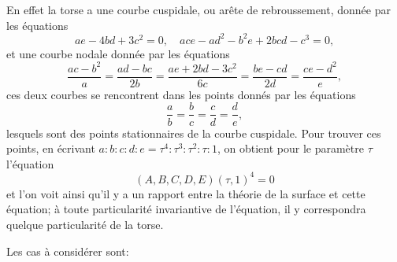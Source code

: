 \documentclass[11pt,a4paper]{article}
\begin{document}
En effet la torse a une courbe cuspidale, ou ar\^ete de rebroussement, donn\'ee par
les \'equations
\[
ae - 4bd + 3c^2 = 0,\quad ace - ad^2 - b^2 e + 2bcd - c^3 = 0,
\]
et une courbe nodale donn\'ee par les \'equations
\[
\frac{ac - b^2}{a} = \frac{ad - bc}{2b} = \frac{ae + 2bd - 3c^2}{6c}
 = \frac{be - cd}{2d} = \frac{ce - d^2}{e},
\]
ces deux courbes se rencontrent dans les points donn\'es par les \'equations
\[
\frac{a}{b} = \frac{b}{c} = \frac{c}{d} = \frac{d}{e},
\]
lesquels sont des points stationnaires de la courbe cuspidale. Pour trouver ces points,
en \'ecrivant $a : b : c : d : e = \tau^4 : \tau^3 : \tau^2 : \tau : 1$, on obtient pour
le param\`etre $\tau$ l'\'equation
\[
(A, B, C, D, E)(\tau, 1)^4 = 0
\]
et l'on voit ainsi qu'il y a un rapport entre la th\'eorie de la surface et cette
\'equation; \`a toute particularit\'e invariantive de l'\'equation, il y correspondra
quelque particularit\'e de la torse.

Les cas \`a consid\'erer sont:
\end{document}
